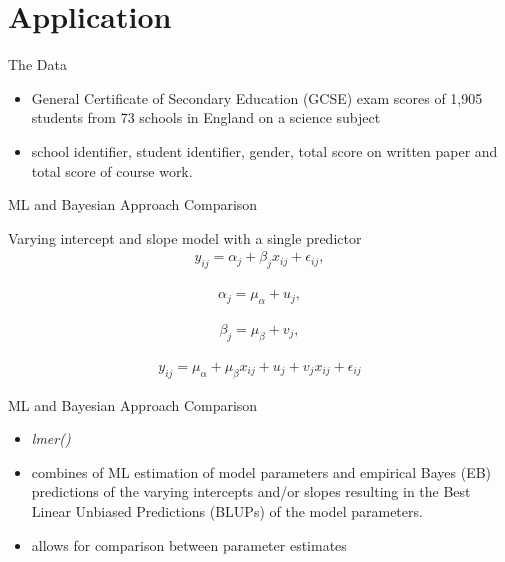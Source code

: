 \section{Application}

\begin{frame}{The Data}
	\Large{
	\begin{itemize}
		\item[]  General Certificate of Secondary Education (GCSE) exam scores of 1,905 students from 73 schools in England on a science subject
		\item[]  school identifier, student identifier, gender, total score on written paper and total score of course work.
				
	\end{itemize}		
	}
\end{frame}


\begin{frame}{ML and Bayesian Approach Comparison}
	\Large{
		 Varying intercept and slope model with a single predictor
		\begin{align}
		y_{ij} = \alpha_j + \beta_j x_{ij} +\epsilon_{ij},
		\end{align}
		
		\begin{align}
		\alpha_j = \mu_\alpha + u_j,
		\end{align}

		\begin{align}
		\beta_j = \mu_\beta + v_j,
		\end{align}	
		
		\begin{align}
		y_{ij} = \mu_\alpha + \mu_\beta x_{ij} + u_j + v_j x_{ij} + \epsilon_{ij}
		\end{align}	
		
	}
\end{frame}

\begin{frame}{ML and Bayesian Approach Comparison}
	\Large{
		\begin{itemize}
		\item[]  \textit{lmer()}
		\item[]  combines of ML estimation of model parameters and empirical Bayes (EB) predictions of the varying intercepts and/or slopes resulting in the Best Linear Unbiased Predictions (BLUPs) of the model parameters.
		\item[]  allows for comparison between parameter estimates
		\end{itemize}		
	}
\end{frame}

